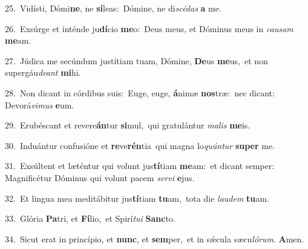 {\numbfont\textcolor{\numbcolor}{25.}}~Vidísti, Dómi\-\textbf{ne}\-, ne \textbf{sí}\-leas:~\star Dómine, ne di\-\textit{scé}\-\textit{das} \textbf{a} me.\par
{\numbfont\textcolor{\numbcolor}{26.}}~Exsúrge et inténde ju\-\textbf{dí}\-cio \textbf{me}\-o:~\star Deus meus, et Dóminus meus in \textit{cau}\-\textit{sam} \textbf{me}\-am.\par
{\numbfont\textcolor{\numbcolor}{27.}}~Júdica me secúndum justítiam tuam, Dómine, \textbf{De}\-us \textbf{me}\-us,~\star et non supergáu\-\textit{de}\-\textit{ant} \textbf{mi}\-hi.\par
{\numbfont\textcolor{\numbcolor}{28.}}~Non dicant in córdibus suis:~\dagger Euge, euge, \textbf{á}\-nimæ \textbf{nos}\-træ:~\star nec dicant: Devorá\-\textit{vi}\-\textit{mus} \textbf{e}\-um.\par
{\numbfont\textcolor{\numbcolor}{29.}}~Erubéscant et revere\-\textbf{án}\-tur \textbf{si}\-mul,~\star qui gratulántur \textit{ma}\-\textit{lis} \textbf{me}\-is.\par
{\numbfont\textcolor{\numbcolor}{30.}}~Induántur confusióne et \textbf{re}\-ve\-\textbf{rén}\-tia~\star qui magna lo\-\textit{quún}\-\textit{tur} \textbf{su}\-\textbf{per} me.\par
{\numbfont\textcolor{\numbcolor}{31.}}~Exsúltent et læténtur qui volunt jus\-\textbf{tí}\-tiam \textbf{me}\-am:~\star et dicant semper: Magnificétur Dóminus qui volunt pacem \textit{ser}\-\textit{vi} \textbf{e}\-jus.\par
{\numbfont\textcolor{\numbcolor}{32.}}~Et lingua mea meditábitur jus\-\textbf{tí}\-tiam \textbf{tu}\-am,~\star tota die \textit{lau}\-\textit{dem} \textbf{tu}\-am.\par
{\numbfont\textcolor{\numbcolor}{33.}}~Glória \textbf{Pa}\-tri, et \textbf{Fí}\-lio,~\star et Spirí\-\textit{tu}\-\textit{i} \textbf{Sanc}\-to.\par
{\numbfont\textcolor{\numbcolor}{34.}}~Sicut erat in princípio, et \textbf{nunc}\-, et \textbf{sem}\-per,~\star et in sǽcula sæcu\-\textit{ló}\-\textit{rum}. \textbf{A}\-men.\par
